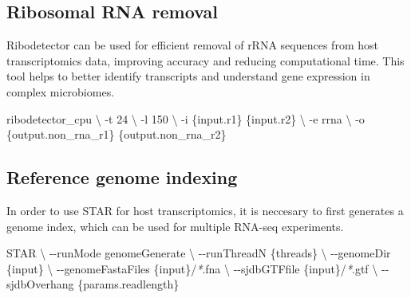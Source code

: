 \documentclass[
]{book}
\newenvironment{Shaded}{\begin{snugshade}}{\end{snugshade}}
\newcommand{\AttributeTok}[1]{\textcolor[rgb]{0.13,0.29,0.53}{#1}}
\newcommand{\DataTypeTok}[1]{\textcolor[rgb]{0.13,0.29,0.53}{#1}}
\newcommand{\ExtensionTok}[1]{#1}
\newcommand{\NormalTok}[1]{#1}
\newcommand{\PreprocessorTok}[1]{\textcolor[rgb]{0.56,0.35,0.01}{\textit{#1}}}
\begin{document}
\normalsize

\hypertarget{ribosomal-rna-removal}{%
\subsection*{Ribosomal RNA removal}\label{ribosomal-rna-removal}}

Ribodetector can be used for efficient removal of rRNA sequences from host transcriptomics data, improving accuracy and reducing computational time. This tool helps to better identify transcripts and understand gene expression in complex microbiomes.

\small

\begin{Shaded}
\begin{Highlighting}[]
\ExtensionTok{ribodetector\_cpu} \DataTypeTok{\textbackslash{}}
      \AttributeTok{{-}t}\NormalTok{ 24 }\DataTypeTok{\textbackslash{}}
      \AttributeTok{{-}l}\NormalTok{ 150 }\DataTypeTok{\textbackslash{}}
      \AttributeTok{{-}i}\NormalTok{ \{input.r1\} \{input.r2\} }\DataTypeTok{\textbackslash{}}
      \AttributeTok{{-}e}\NormalTok{ rrna }\DataTypeTok{\textbackslash{}}
      \AttributeTok{{-}o}\NormalTok{ \{output.non\_rna\_r1\} \{output.non\_rna\_r2\}}
\end{Highlighting}
\end{Shaded}

\normalsize

\hypertarget{reference-genome-indexing}{%
\subsection*{Reference genome indexing}\label{reference-genome-indexing}}

In order to use STAR for host transcriptomics, it is neccesary to first generates a genome index, which can be used for multiple RNA-seq experiments.

\small

\begin{Shaded}
\begin{Highlighting}[]
\ExtensionTok{STAR} \DataTypeTok{\textbackslash{}}
      \AttributeTok{{-}{-}runMode}\NormalTok{ genomeGenerate }\DataTypeTok{\textbackslash{}}
      \AttributeTok{{-}{-}runThreadN}\NormalTok{ \{threads\} }\DataTypeTok{\textbackslash{}}
      \AttributeTok{{-}{-}genomeDir}\NormalTok{ \{input\} }\DataTypeTok{\textbackslash{}}
      \AttributeTok{{-}{-}genomeFastaFiles}\NormalTok{ \{input\}/}\PreprocessorTok{*}\NormalTok{.fna }\DataTypeTok{\textbackslash{}}
      \AttributeTok{{-}{-}sjdbGTFfile}\NormalTok{ \{input\}/}\PreprocessorTok{*}\NormalTok{.gtf }\DataTypeTok{\textbackslash{}}
      \AttributeTok{{-}{-}sjdbOverhang}\NormalTok{ \{params.readlength\}}
\end{Highlighting}
\end{Shaded}
\end{document}
